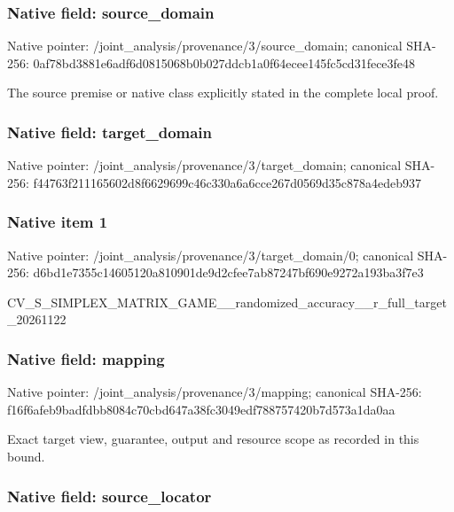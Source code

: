 \documentclass[10pt,a4paper]{article}
\begin{document}
\subsubsection{Native field: source\_domain}


Native pointer: /joint\_analysis/provenan\allowbreak{}ce/3/source\_domain; canonical SHA-256: 0af78bd3881e6adf6d081506\allowbreak{}8b0b027ddcb1a0f64ecee145\allowbreak{}fc5cd31fece3fe48


The source premise or native class explicitly stated in the complete local proof.


\subsubsection{Native field: target\_domain}


Native pointer: /joint\_analysis/provenan\allowbreak{}ce/3/target\_domain; canonical SHA-256: f44763f211165602d8f66296\allowbreak{}99c46c330a6a6cce267d0569\allowbreak{}d35c878a4edeb937



\subsubsection{Native item 1}


Native pointer: /joint\_analysis/provenan\allowbreak{}ce/3/target\_domain/0; canonical SHA-256: d6bd1e7355c14605120a8109\allowbreak{}01de9d2cfee7ab87247bf690\allowbreak{}e9272a193ba3f7e3


CV\_S\_SIMPLEX\_MATRIX\_GAME\allowbreak{}\_\_randomized\_accuracy\_\_r\allowbreak{}\_full\_target\_20261122


\subsubsection{Native field: mapping}


Native pointer: /joint\_analysis/provenance/3/mapping; canonical SHA-256: f16f6afeb9badfdbb8084c70\allowbreak{}cbd647a38fc3049edf788757\allowbreak{}420b7d573a1da0aa


Exact target view, guarantee, output and resource scope as recorded in this bound.


\subsubsection{Native field: source\_locator}
\end{document}

